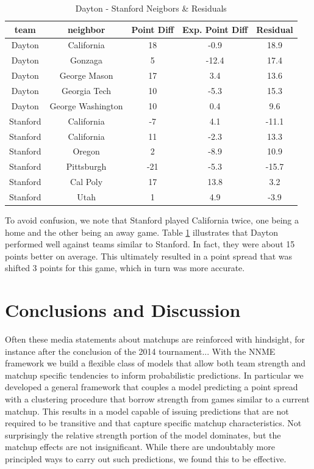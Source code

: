 \documentclass[letterpaper,12pt]{article}
\begin{document}
\begin{table}[h!]
\caption{Dayton - Stanford Neigbors \& Residuals}
\small
\centering
\begin{tabular}{|c|cccc |}
   \hline
   \hline
 team & neighbor &  Point Diff& Exp. Point Diff & Residual \\
  \hline
Dayton & California & 18 & -0.9 & 18.9\\
Dayton & Gonzaga & 5 & -12.4 & 17.4\\
Dayton & George Mason& 17 & 3.4 & 13.6\\
Dayton &  Georgia Tech& 10 & -5.3 & 15.3\\
Dayton & George Washington& 10 & 0.4 & 9.6\\
\hline
Stanford & California&-7 & 4.1&-11.1 \\
Stanford & California &11 &-2.3 &13.3 \\
Stanford & Oregon&2 &-8.9 &10.9 \\
Stanford & Pittsburgh&-21 &-5.3 &-15.7 \\
Stanford & Cal Poly&17 &13.8 &3.2 \\
Stanford & Utah&1 &4.9 &-3.9 \\
   \hline
   \hline
\end{tabular}
\label{tab:DayStan}
\end{table}
To avoid confusion, we note that Stanford played California twice, one being a home and the other being an away game.  Table \ref{tab:DayStan} illustrates that Dayton performed well against teams similar to Stanford. In fact, they were about 15 points better on average. This ultimately resulted in a point spread that was shifted 3 points for this game, which in turn was more accurate.

\section{Conclusions and Discussion}
Often these media statements about matchups are reinforced with hindsight, for instance after the conclusion of the 2014 tournament... 
With the NNME framework we build a flexible class of models that allow both team strength and matchup specific tendencies to inform probabilistic predictions. In particular we developed a general framework that couples a model predicting a point spread with a clustering procedure that borrow strength from games similar to a current matchup. This results in a model capable of issuing predictions that are not required to be transitive and that capture specific matchup characteristics. Not surprisingly the relative strength portion of the model dominates, but the matchup effects are not insignificant. While there are undoubtably more principled ways to carry out such predictions, we found this to be effective.
\end{document}
